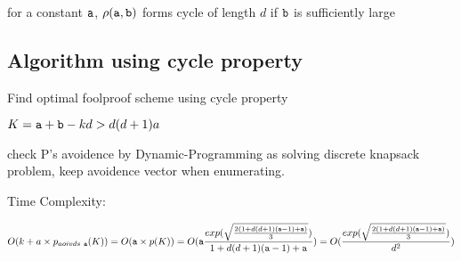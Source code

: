 \begin{corollary}
for a constant $\mathtt{a}$, $\rho(\mathtt{a},\mathtt{b})$ forms cycle of length $d$ if $\mathtt{b}$ is sufficiently large
\end{corollary}

\subsection{Algorithm using cycle property}

\begin{algorithm}
\caption{Find optimal foolproof scheme using cycle property}\label{alg:cycle}
\begin{algorithmic}
  \State $K=\mathtt{a}+\mathtt{b}-kd>d(d+1)a$ 
  \EndProcedure
\end{algorithmic}
\end{algorithm}
check P's avoidence by Dynamic-Programming as solving discrete knapsack problem, keep avoidence vector when enumerating.

Time Complexity:

\[
O(k+a\times p_{aoivds\ \mathtt{a}}(K))\\
= O(\mathtt{a}\times p(K))\\
= O(\mathtt{a}\frac{exp(\sqrt{\frac{2(1+d(d+1)(\mathtt{a}-1)+\mathtt{a})}{3} } )}{1+d(d+1)(\mathtt{a}-1)+\mathtt{a}})
= O(\frac{exp(\sqrt{\frac{2(1+d(d+1)(\mathtt{a}-1)+\mathtt{a})}{3} } )}{d^2})
\]
